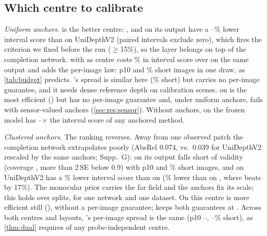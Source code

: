 \subsection{Which centre to calibrate}
\label{sec:res:omni}
\emph{Uniform anchors.} \omnidc is the better centre: \mSplitCP, \mDual and \mDistSplit on its output have a \NumOmniGainLo--\NumOmniGainHi\% lower interval score than \mDual on UniDepthV2 (paired intervals exclude zero), which fires the criterion we fixed before the run ($\ge$15\%), so the layer belongs on top of the completion network.
\mDual with \omnidc as centre costs \NumOmniDualCost\% in interval score over \mSplitCP on the same output and adds the per-image law: p10  and \% short images in one draw, as \cref{tab:budget} predicts.
\mSplitCP's spread is similar here (\% short) but carries no per-image guarantee, and it needs dense reference depth on calibration scenes.
\mDistSplit on \omnidc is the most efficient () but has no per-image guarantee and, under uniform anchors, fails with sensor-valued anchors (\cref{sec:res:sensor}).
Without anchors, \mSplitCP on the frozen model has \NumRawRatioLo--\NumRawRatioHi$\times$ the interval score of any anchored method.

\emph{Clustered anchors.} The ranking reverses.
Away from one observed patch the completion network extrapolates poorly (AbsRel 0.074, vs.\ 0.039 for UniDepthV2 rescaled by the same anchors; Supp.~G): \mSplitCP on its output falls short of validity (coverage , more than 2\,SE below 0.9) with p10  and \% short images, and \mDual on UniDepthV2 has a \NumClusterGainDual\% lower interval score than \mDual on \omnidc (\NumClusterGainCP\% lower than \mSplitCP on \omnidc, where \mDual beats \mSplitCP by 17\%).
The monocular prior carries the far field and the anchors fix its scale; this holds over \NumOmniSeeds{} splits, for one network and one dataset.
On this centre \mDistSplit is more efficient still (), without a per-image guarantee; \mDualBoth keeps both guarantees at .
Across both centres and layouts, \mDual's per-image spread is the same (p10 \NumENineteenPTenLo--\NumENineteenPTenHi, \NumENineteenShortLo--\NumENineteenShortHi\% short), as \cref{thm:dual} requires of any probe-independent centre.
